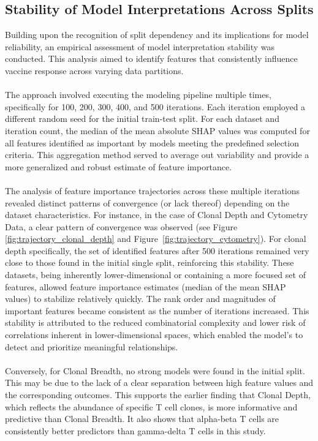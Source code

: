\documentclass[12pt,a4paper]{report}
\begin{document}
\subsection{Stability of Model Interpretations Across Splits}
\label{subsec:stability_of_model_interpretations_across_splits}
\noindent
Building upon the recognition of split dependency and its implications for model reliability, an empirical assessment of model interpretation stability was conducted. This analysis aimed to identify features that consistently influence vaccine response across varying data partitions.\\
\\
The approach involved executing the modeling pipeline multiple times, specifically for 100, 200, 300, 400, and 500 iterations. Each iteration employed a different random seed for the initial train-test split. For each dataset and iteration count, the median of the mean absolute SHAP values was computed for all features identified as important by models meeting the predefined selection criteria. This aggregation method served to average out variability and provide a more generalized and robust estimate of feature importance.\\
\\
The analysis of feature importance trajectories across these multiple iterations revealed distinct patterns of convergence (or lack thereof) depending on the dataset characteristics. For instance, in the case of Clonal Depth and Cytometry Data, a clear pattern of convergence was observed (see Figure \ref{fig:trajectory_clonal_depth} and Figure~\ref{fig:trajectory_cytometry}). For clonal depth specifically, the set of identified features after 500 iterations remained very close to those found in the initial single split, reinforcing this stability. These datasets, being inherently lower-dimensional or containing a more focused set of features, allowed feature importance estimates (median of the mean SHAP values) to stabilize relatively quickly. The rank order and magnitudes of important features became consistent as the number of iterations increased. This stability is attributed to the reduced combinatorial complexity and lower risk of correlations inherent in lower-dimensional spaces, which enabled the model's to detect and prioritize meaningful relationships.\\
\\
Conversely, for Clonal Breadth, no strong models were found in the initial split. This may be due to the lack of a clear separation between high feature values and the corresponding outcomes. This supports the earlier finding that Clonal Depth, which reflects the abundance of specific T cell clones, is more informative and predictive than Clonal Breadth. It also shows that alpha-beta T cells are consistently better predictors than gamma-delta T cells in this study.\\
\end{document}
